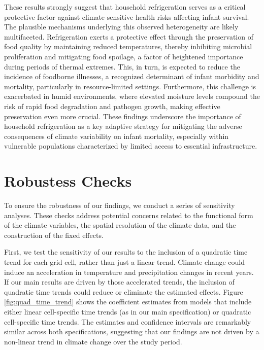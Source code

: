 \documentclass[a4paper]{article}
\begin{document}
These results strongly suggest that household refrigeration serves as a critical protective factor against climate-sensitive health risks affecting infant survival. The plausible mechanisms underlying this observed heterogeneity are likely multifaceted. Refrigeration exerts a protective effect through the preservation of food quality by maintaining reduced temperatures, thereby inhibiting microbial proliferation and mitigating food spoilage, a factor of heightened importance during periods of thermal extremes. This, in turn, is expected to reduce the incidence of foodborne illnesses, a recognized determinant of infant morbidity and mortality, particularly in resource-limited settings. Furthermore, this challenge is exacerbated in humid environments, where elevated moisture levels compound the risk of rapid food degradation and pathogen growth, making effective preservation even more crucial. These findings underscore the importance of household refrigeration as a key adaptive strategy for mitigating the adverse consequences of climate variability on infant mortality, especially within vulnerable populations characterized by limited access to essential infrastructure.






\section{Robustess Checks}

To ensure the robustness of our findings, we conduct a series of sensitivity analyses. These checks address potential concerns related to the functional form of the climate variables, the spatial resolution of the climate data, and the construction of the fixed effects.

First, we test the sensitivity of our results to the inclusion of a quadratic time trend for each grid cell, rather than just a linear trend.  Climate change could induce an acceleration in temperature and precipitation changes in recent years. If our main results are driven by those accelerated trends, the inclusion of quadratic time trends could reduce or eliminate the estimated effects.  Figure \ref{fig:quad_time_trend} shows the coefficient estimates from models that include either linear cell-specific time trends (as in our main specification) or quadratic cell-specific time trends.  The estimates and confidence intervals are remarkably similar across both specifications, suggesting that our findings are not driven by a non-linear trend in climate change over the study period.
\end{document}
